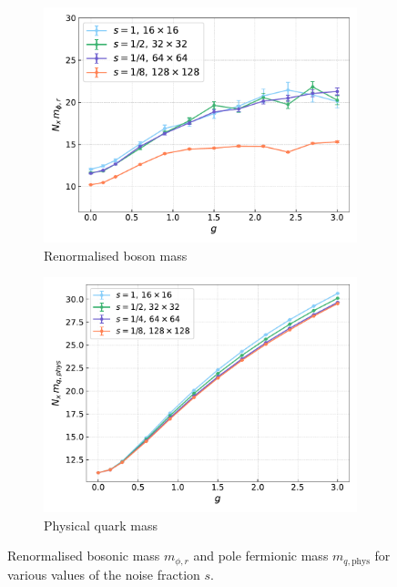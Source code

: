 \begin{figure}[h!]
    \begin{subfigure}{0.47\textwidth}
        \includegraphics[width=\textwidth]{figures/cooling/yukawa_scan/mphir.pdf}
        \caption{Renormalised boson mass}
    \end{subfigure}
    \hfill 
    \begin{subfigure}{0.47\textwidth}
        \includegraphics[width=\textwidth]{figures/cooling/yukawa_scan/mqphys.pdf}
        \caption{Physical quark mass}
    \end{subfigure}
    \caption[More observables in the cooling procedure as a function of the Yukawa coupling]{Renormalised bosonic mass $m_{\phi, r}$ and pole fermionic mass $m_{q,\text{phys}}$ for various values of the noise fraction $s$.}
    \label{fig:cooling_yukawa_masses}
\end{figure} \\
